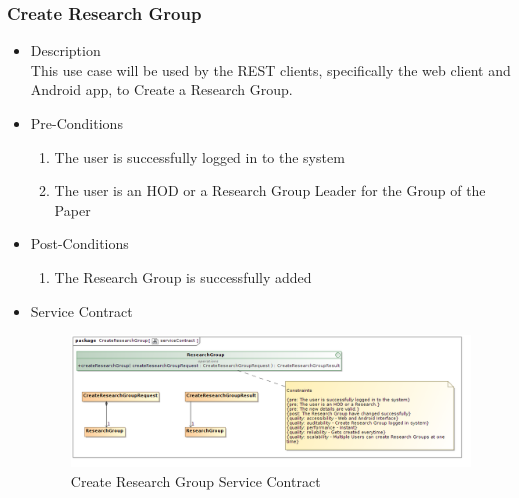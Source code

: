 \documentclass[a4paper,10pt]{article}
\begin{document}
\subsubsection{Create Research Group}
	\begin{itemize}
		\item Description\\
			This use case will be used by the REST clients, specifically the web client and Android app, to Create a Research Group.
		\item Pre-Conditions
			\begin{enumerate}
				\item The user is successfully logged in to the system
				\item The user is an HOD or a Research Group Leader for the Group of the Paper
			\end{enumerate}
		\item Post-Conditions
			\begin{enumerate}
				\item The Research Group is successfully added
						
			\end{enumerate}
		\item Service Contract
			\begin{figure}[H]
				\includegraphics[scale=0.5]{createResearchGroup}
				\caption{Create Research Group Service Contract}
			\end{figure}
	\end{itemize}
	
\end{document}
